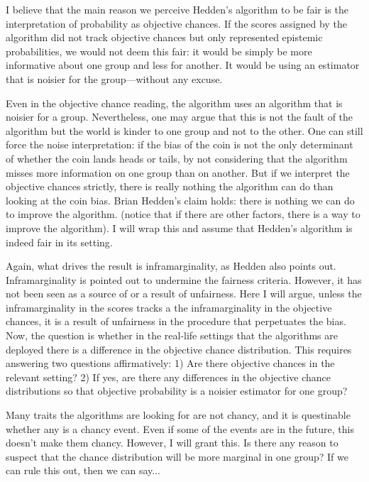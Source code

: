 \documentclass{article}
\begin{document}
I believe that the main reason we perceive Hedden's algorithm to be fair is the interpretation of probability as objective chances. If the scores assigned by the algorithm did not track objective chances but only represented epistemic probabilities, we would not deem this fair: it would be simply be more informative about one group and less for another. It would be using an estimator that is noisier for the group---without any excuse. 

Even in the objective chance reading, the algorithm uses an algorithm that is noisier for a group. Nevertheless, one may argue that this is not the fault of the algorithm but the world is kinder to one group and not to the other. One can still force the noise interpretation: if the bias of the coin is not the only determinant of whether the coin lands heads or tails, by not considering that the algorithm misses more information on one group than on another. But if we interpret the objective chances strictly, there is really nothing the algorithm can do than looking at the coin bias. Brian Hedden's claim holds: there is nothing we can do to improve the algorithm. (notice that if there are other factors, there is a way to improve the algorithm). I will wrap this and assume that Hedden's algorithm is indeed fair in its setting. 

Again, what drives the result is inframarginality, as Hedden also points out. Inframarginality is pointed out to undermine the fairness criteria. However, it has not been seen as a source of or a result of unfairness. Here I will argue, unless the inframarginality in the scores tracks a the inframarginality in the objective chances, it is a result of unfairness in the procedure that perpetuates the bias. Now, the question is whether in the real-life settings that the algorithms are deployed there is a difference in the objective chance distribution. This requires answering two questions affirmatively: 1) Are there objective chances in the relevant setting? 2) If yes, are there any differences in the objective chance distributions so that objective probability is a noisier estimator for one group? 

Many traits the algorithms are looking for are not chancy, and it is questinable whether any is a chancy event. Even if some of the events are in the future, this doesn't make them chancy. However, I will grant this. Is there any reason to suspect that the chance distribution will be more marginal in one group? If we can rule this out, then we can say... 
\end{document}
